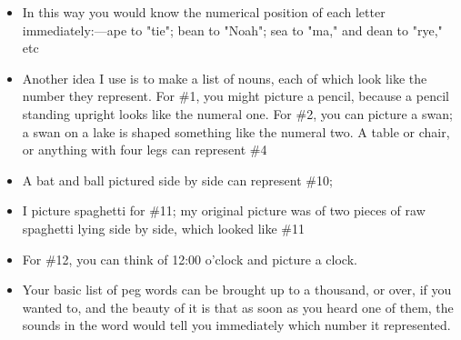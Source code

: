 \begin{itemize}
            \item In this way you would know the numerical position of
            each letter immediately:—ape to "tie"; bean to "Noah";
            sea to "ma," and dean to "rye," etc
            \item Another idea I use is to make a list of nouns, each of
            which look like the number they represent.
                \subitem For \#1, you
            might picture a pencil, because a pencil standing upright
            looks like the numeral one.
                \subitem For \#2, you can picture a swan;
            a swan on a lake is shaped something like the numeral
            two.
                \subitem A table
            or chair, or anything with four legs can represent \#4
            \item A bat and ball pictured side by side can represent
            \#10;
            \item I picture spaghetti for \#11; my original picture was of two
            pieces of raw spaghetti lying side by side, which looked like
            \#11
            \item For \#12, you can think of 12:00 o'clock and picture
            a clock.
            \item Your basic list of peg words can
            be brought up to a thousand, or over, if you wanted to, and
            the beauty of it is that as soon as you heard one of them,
            the sounds in the word would tell you immediately which
            number it represented.
        \end{itemize}


